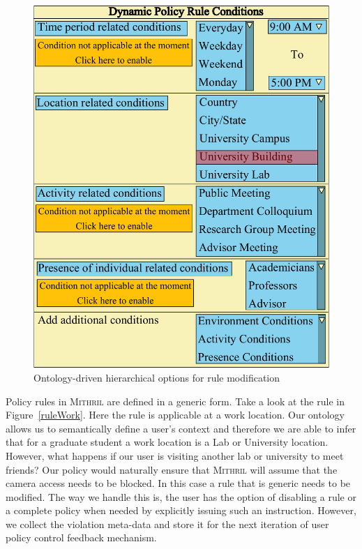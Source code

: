 \begin{figure}[tb]
	\centering	\includegraphics[width=\columnwidth]{images/genspec}
	\caption{Ontology-driven hierarchical options for rule modification}
	\label{fig:genspec}
\end{figure}

Policy rules in \textsc{Mithril} are defined in a generic form. Take a look at the rule in Figure~\ref{ruleWork}. Here the rule is applicable at a work location. Our ontology allows us to semantically define a user's context and therefore we are able to infer that for a graduate student a work location is a Lab or University location. However, what happens if our user is visiting another lab or university to meet friends? Our policy would naturally ensure that \textsc{Mithril} will assume that the camera access needs to be blocked. In this case a rule that is generic needs to be modified. The way we handle this is, the user has the option of disabling a rule or a complete policy when needed by explicitly issuing such an instruction. However, we collect the violation meta-data and store it for the next iteration of user policy control feedback mechanism.

